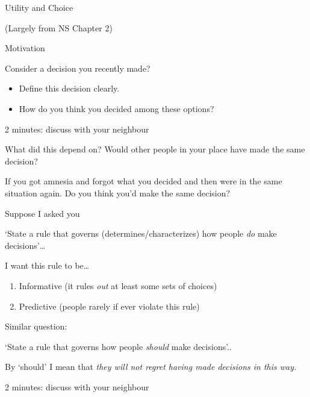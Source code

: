 \documentclass[table]{beamer}
\author{David Reinstein (Exeter)}
\date{25/09/2019}
\begin{document}
\begin{frame}{Utility and Choice}
\protect\hypertarget{utility-and-choice}{}

(Largely from NS Chapter 2)

\end{frame}

\begin{frame}{Motivation}
\protect\hypertarget{motivation}{}

Consider a decision you recently made?

\bigskip

\begin{itemize}
\item
  Define this decision clearly.
\item
  How do you think you decided among these options?
\end{itemize}

2 minutes: discuss with your neighbour

What did this depend on? Would other people in your place have made the
same decision?

If you got amnesia and forgot what you decided and then were in the same
situation again. Do you think you'd make the same decision?

\end{frame}

\begin{frame}

Suppose I asked you

`State a rule that governs (determines/characterizes) how people
\emph{do} make decisions'\ldots{}

\bigskip

I want this rule to be\ldots{}

\begin{enumerate}
\item
  Informative (it rules \emph{out} at least some sets of choices)
\item
  Predictive (people rarely if ever violate this rule)
\end{enumerate}

\end{frame}

\begin{frame}

Similar question:

`State a rule that governs how people \emph{should} make decisions'..

\bigskip

By `should' I mean that \emph{they will not regret having made decisions
in this way.}

2 minutes: discuss with your neighbour

\end{frame}
\end{document}
